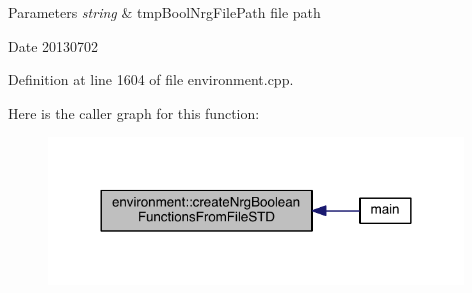 \begin{DoxyParams}{Parameters}
{\em string} & tmp\+Bool\+Nrg\+File\+Path file path \\
\hline
\end{DoxyParams}
\begin{DoxyDate}{Date}
20130702 
\end{DoxyDate}


Definition at line 1604 of file environment.\+cpp.



Here is the caller graph for this function\+:\nopagebreak
\begin{figure}[H]
\begin{center}
\leavevmode
\includegraphics[width=312pt]{a00013_abe1a616460ea328067874df715679319_icgraph}
\end{center}
\end{figure}


